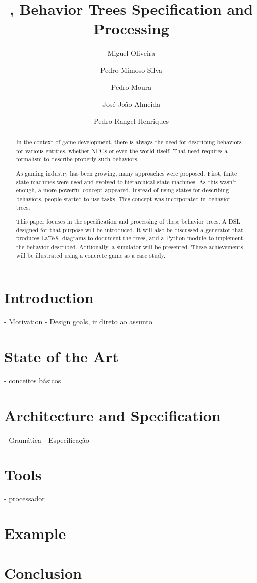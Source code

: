 \documentclass[a4paper,UKenglish,cleveref, autoref, thm-restate]{oasics-v2019}
\title{\bht, Behavior Trees Specification and Processing} %
\author{Miguel Oliveira}{Centro ALGORITMI, DI, Universidade do Minho, Portugal}{}{}{}
\author{Pedro Mimoso Silva}{Centro ALGORITMI, DI, Universidade do Minho, Portugal}{}{}{}
\author{Pedro Moura}{Centro ALGORITMI, DI, Universidade do Minho, Portugal}{}{}{}
\author{José João Almeida}{Centro ALGORITMI, DI, Universidade do Minho, Portugal}{}{}{}
\author{Pedro Rangel Henriques}{Centro ALGORITMI, DI, Universidade do Minho, Portugal}{}{}{}
\begin{document}
\maketitle

\begin{abstract}
In the context of game development, there is always the need for describing behaviors for various entities, whether NPCs or even the world itself.
That need requires a formalism to describe properly such behaviors.

As gaming industry has been growing, many approaches were proposed.
First, finite state machines were used and evolved to hierarchical state machines.
As this wasn't enough, a more powerful concept appeared.
Instead of using states for describing behaviors, people started to use tasks.
This concept was incorporated in behavior trees.

This paper focuses in the specification and processing of these behavior trees.
A DSL designed for that purpose will be introduced.
It will also be discussed a generator that produces \LaTeX\ diagrams to document the trees, and a Python module to implement the behavior described.
Aditionally, a simulator will be presented. 
These achievements will be illustrated using a concrete game as a case study.
\end{abstract}


\section{Introduction}
\label{sec:introduction}
- Motivation
- Design goals, ir direto ao assunto

\section{State of the Art}
\label{sec:state-of-the-art}
- conceitos básicos

\section{Architecture and Specification}
\label{sec:arc-spec}

- Gramática
- Especificação


\section{Tools}
\label{sec:tools}
- processador

\section{Example}
\label{sec:example}

\section{Conclusion}
\label{sec:conclusion}
\end{document}
